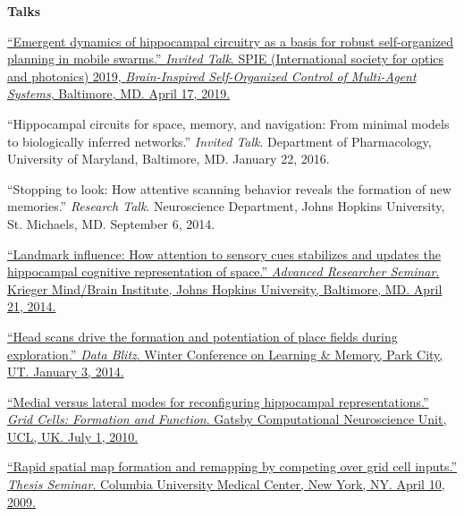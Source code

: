 \documentclass[10pt]{article}
\begin{document}
\begin{description}
\item \textbf{Talks}
\item[\quad] \href{https://spie.org/SI/conferencedetails/micro-nanotechnology-sensors-systems-applications?SSO=1#session-15}{``Emergent dynamics of hippocampal circuitry as a basis for robust self-organized planning in mobile swarms.'' \emph{Invited Talk}. SPIE (International society for optics and photonics) 2019, \emph{Brain-Inspired Self-Organized Control of Multi-Agent Systems}, Baltimore, MD. April 17, 2019.}
\item[\quad] ``Hippocampal circuits for space, memory, and navigation: From minimal models to biologically inferred networks.'' \emph{Invited Talk}. Department of Pharmacology, University of Maryland, Baltimore, MD. January 22, 2016.
\item[\quad] ``Stopping to look: How attentive scanning behavior reveals the formation of new memories.'' \emph{Research Talk}. Neuroscience Department, Johns Hopkins University, St. Michaels, MD. September 6, 2014.
\item[\quad] \href{http://jdmonaco.com/files/mbi-seminar-abstract.pdf}{``Landmark influence: How attention to sensory cues stabilizes and updates the hippocampal cognitive representation of space.'' \emph{Advanced Researcher Seminar}. Krieger Mind/Brain Institute, Johns Hopkins University, Baltimore, MD. April 21, 2014.}
\item[\quad] \href{http://jdmonaco.com/files/ScanningSlide.pdf}{``Head scans drive the formation and potentiation of place fields during exploration.'' \emph{Data Blitz}. Winter Conference on Learning \& Memory, Park City, UT. January 3, 2014.}
\item[\quad] \href{http://www.gatsby.ucl.ac.uk/workshopjune2010/abstractmonaco.htm}{``Medial versus lateral modes for reconfiguring hippocampal representations.'' \emph{Grid Cells: Formation and Function}. Gatsby Computational Neuroscience Unit, UCL, UK. July 1, 2010.}
\item[\quad] \href{http://dx.doi.org/10.6084/m9.figshare.693750}{``Rapid spatial map formation and remapping by competing over grid cell inputs.'' \emph{Thesis Seminar}. Columbia University Medical Center, New York, NY. April 10, 2009.}
\end{description}
\end{document}
